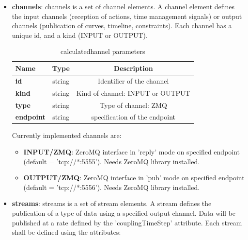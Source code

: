 \documentclass[a4paper, 12pt]{report}
\begin{document}
\begin{itemize}

\item \textbf{channels}: channels is a set of channel elements. A channel element defines the input channels (reception of actions, time management signals) or output channels (publication of curves, timeline, constraints). Each channel has a unique id, and a kind (INPUT or OUTPUT).


\begin{table}[H]
\center
\begin{tabular}{ l | c | c }
\toprule
\textbf{{Name}} & \textbf{{Type}} & \textbf{{Description}} \\
\midrule
\rowcolor{white}
\textbf{id} & string & Identifier of the channel \\
\rowcolor{gray!10}
\textbf{kind} & string & Kind of channel: INPUT or OUTPUT \\
\rowcolor{white}
\textbf{type} & string & Type of channel: ZMQ \\
\rowcolor{gray!10}
\textbf{endpoint} & string & specification of the endpoint \\
\bottomrule
\end{tabular}
\caption{calculatedhannel parameters}
\end{table}

Currently implemented channels are:
\begin{itemize}
  \item \textbf{INPUT/ZMQ}: ZeroMQ interface in 'reply' mode on specified endpoint (default = 'tcp://*:5555'). Needs ZeroMQ library installed.
  \item \textbf{OUTPUT/ZMQ}: ZeroMQ interface in 'pub' mode on specified endpoint  (default = 'tcp://*:5556'). Needs ZeroMQ library installed.
\end{itemize}

\item \textbf{streams}: streams is a set of stream elements. A stream defines the publication of a type of data using a specified output channel. Data will be published at a rate defined by the 'couplingTimeStep' attribute. Each stream shall be defined using the attributes:


\end{itemize}
\end{document}
